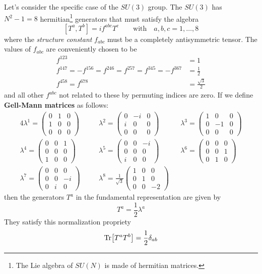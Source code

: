 \documentclass[TheoreticalPhy_ModB.tex]{subfiles}
\begin{document}
Let's consider the specific case of the $SU(3)$ group. The $SU(3)$ has $N^2-1=8$ hermitian\footnote{The Lie algebra of $SU(N)$ is made of hermitian matrices.} generators that must satisfy the algebra
\[[T^a,T^b]=if^{abc}T^c\qquad\text{with}\quad a,b,c=1,\dots,8\]
where the \emph{structure constant} $f_{abc}$ must be a completely antisymmetric tensor. The values of $f_{abc}$ are conveniently chosen to be
\begin{align*}
f^{123} &= 1\\
f^{147} = -f^{156} = f^{246} = f^{257} = f^{345} = -f^{367} &= \frac{1}{2} \\
f^{458} = f^{678} &= \frac{\sqrt{3}}{2}
\end{align*}
and all other $f^{abc}$ not related to these by permuting indices are zero. If we define \textbf{Gell-Mann matrices} as follows:
\begin{alignat*}{4}
\lambda^1 = \begin{pmatrix} 0 & 1 & 0 \\ 1 & 0 & 0 \\ 0 & 0 & 0 \end{pmatrix}\quad
&&\lambda^2 = \begin{pmatrix} 0 & -i & 0 \\ i & 0 & 0 \\ 0 & 0 & 0 \end{pmatrix}\quad
&&\lambda^3 = \begin{pmatrix} 1 & 0 & 0 \\ 0 & -1 & 0 \\ 0 & 0 & 0 \end{pmatrix}\\
\lambda^4 = \begin{pmatrix} 0 & 0 & 1 \\ 0 & 0 & 0 \\ 1 & 0 & 0 \end{pmatrix}\quad
&&\lambda^5 = \begin{pmatrix} 0 & 0 & -i \\ 0 & 0 & 0 \\ i & 0 & 0 \end{pmatrix}\quad
&&\lambda^6 = \begin{pmatrix} 0 & 0 & 0 \\ 0 & 0 & 1 \\ 0 & 1 & 0 \end{pmatrix}\\
\lambda^7 = \begin{pmatrix} 0 & 0 & 0 \\ 0 & 0 & -i \\ 0 & i & 0 \end{pmatrix}\quad
&&\lambda^8 = \frac{1}{\sqrt{3}} \begin{pmatrix} 1 & 0 & 0 \\ 0 & 1 & 0 \\ 0 & 0 & -2 \end{pmatrix}
&&
\end{alignat*}
then the generators $T^a$ in the fundamental representation are given by
\[T^a=\frac12\lambda^a\]
They satisfy this normalization propriety
\begin{equation}\label{eqn:Gellmann-matrices-norm}
\Tr[T^aT^b]=\frac12\delta_{ab}
\end{equation}
\end{document}

